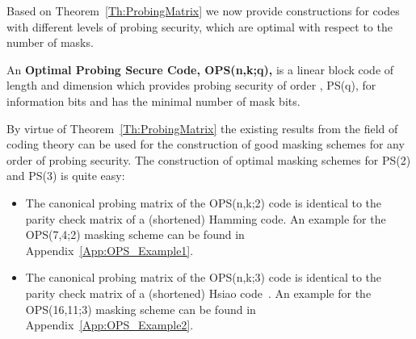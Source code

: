 \documentclass[11pt]{llncs}
\newcommand{\BDEF}{\begin{definition}}  \newcommand{\EDEF}{\end{definition}}
\begin{document}
Based on Theorem~\ref{Th:ProbingMatrix} we now provide
constructions for codes with different levels of probing security,
which are optimal with respect to the number of masks.
\BDEF\label{Def:OPS}
An \textbf{Optimal Probing Secure Code, OPS(n,k;q),}
is a linear block code of length  and dimension 
which provides probing security of order , PS(q),
for  information bits
and has the minimal number  of mask bits.
\EDEF
By virtue of Theorem~\ref{Th:ProbingMatrix} the existing results
from the field of coding theory can be used for the construction
of good masking schemes for any order of probing security.
The construction of optimal masking schemes for PS(2) and PS(3)
is quite easy:
\begin{itemize}
\item The canonical probing matrix 
of the OPS(n,k;2) code is identical
to the parity check matrix of a (shortened)
 Hamming code.
An example for the OPS(7,4;2) masking scheme can be found in
Appendix~\ref{App:OPS_Example1}.

\item The canonical probing matrix 
of the OPS(n,k;3) code is identical
to the parity check matrix of a (shortened)
 Hsiao code~\cite{Hsiao1970ClassofOptimal}.
An example for the OPS(16,11;3) masking scheme can be found in
Appendix~\ref{App:OPS_Example2}.
\end{itemize}
\end{document}
